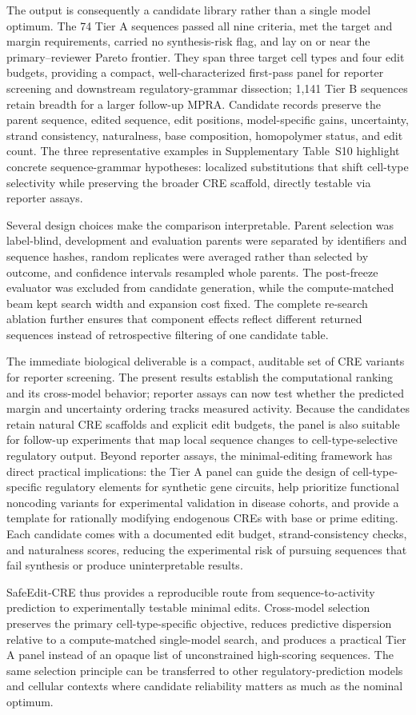 The output is consequently a candidate library rather than a single model optimum.
The 74 Tier A sequences passed all nine criteria, met the target and margin
requirements, carried no synthesis-risk flag, and lay on or near the
primary--reviewer Pareto frontier. They span three target cell types and four edit
budgets, providing a compact, well-characterized first-pass panel for reporter
screening and downstream regulatory-grammar dissection; 1,141 Tier B
sequences retain breadth for a larger follow-up MPRA. Candidate records preserve the
parent sequence, edited sequence, edit positions, model-specific gains, uncertainty,
strand consistency, naturalness, base composition, homopolymer status, and edit count.
The three representative examples in Supplementary Table~S10 highlight concrete
sequence-grammar hypotheses: localized substitutions that shift cell-type selectivity
while preserving the broader CRE scaffold, directly testable via reporter assays.

Several design choices make the comparison interpretable. Parent selection was
label-blind, development and evaluation parents were separated by identifiers and
sequence hashes, random replicates were averaged rather than selected by outcome, and
confidence intervals resampled whole parents. The post-freeze evaluator was excluded
from candidate generation, while the compute-matched beam kept search width and
expansion cost fixed. The complete re-search ablation further ensures that component
effects reflect different returned sequences instead of retrospective filtering of one
candidate table.

The immediate biological deliverable is a compact, auditable set of CRE variants for
reporter screening. The present results establish the computational ranking and its
cross-model behavior; reporter assays can now test whether the predicted margin and
uncertainty ordering tracks measured activity. Because the candidates retain natural
CRE scaffolds and explicit edit budgets, the panel is also suitable for follow-up
experiments that map local sequence changes to cell-type-selective regulatory output.
Beyond reporter assays, the minimal-editing framework has direct practical implications:
the Tier A panel can guide the design of cell-type-specific regulatory elements for
synthetic gene circuits, help prioritize functional noncoding variants for experimental
validation in disease cohorts, and provide a template for rationally modifying endogenous
CREs with base or prime editing. Each candidate comes with a documented edit budget,
strand-consistency checks, and naturalness scores, reducing the experimental risk of
pursuing sequences that fail synthesis or produce uninterpretable results.

SafeEdit-CRE thus provides a reproducible route from sequence-to-activity prediction
to experimentally testable minimal edits. Cross-model selection preserves the primary
cell-type-specific objective, reduces predictive dispersion relative to a
compute-matched single-model search, and produces a practical Tier A panel instead of
an opaque list of unconstrained high-scoring sequences. The same selection principle
can be transferred to other regulatory-prediction models and cellular contexts where
candidate reliability matters as much as the nominal optimum.
